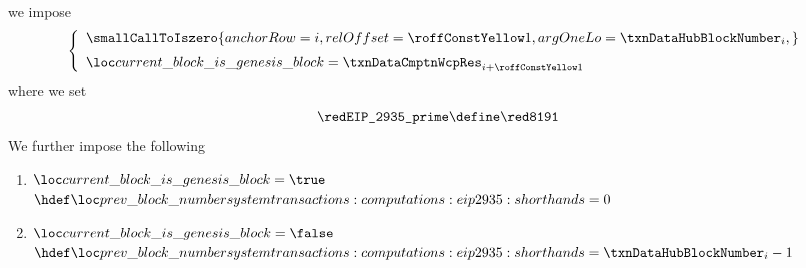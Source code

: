 \item[\underline{\underline{Defining the ``previous block number'':}}]
	we impose
	\[
		\left\{ \begin{array}{l}
			\smallCallToIszero {
				anchorRow = i                                       ,
				relOffset = \previousBlockNumberDefinitionRowOffset ,
				argOneLo  = \txnDataHubBlockNumber _{i}             ,
			}
			\vspace{2mm} \\
			\locCurrentBlockIsGenesisBlock
			=
			\txnDataCmptnWcpRes _{i + \previousBlockNumberDefinitionRowOffset} \\
		\end{array} \right.
	\]
	where we set
	\[
		\locBlockHashPrimeModulus \define \locBlockHashPrimeModulusValue
	\]
	We further impose the following
	\begin{enumerate}
	        \item \If $\locCurrentBlockIsGenesisBlock = \true$  \Then $\locPreviousBlockNumber = 0$
	        \item \If $\locCurrentBlockIsGenesisBlock = \false$ \Then $\locPreviousBlockNumber = \txnDataHubBlockNumber _{i} - 1$
	\end{enumerate}
